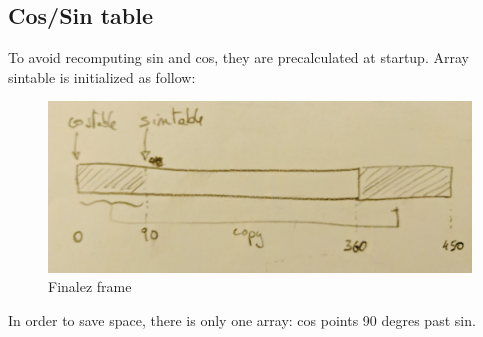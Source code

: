 \begin{minipage}{\linewidth}

\end{minipage}

\subsection{Cos/Sin table}
To avoid recomputing sin and cos, they are precalculated at startup. Array sintable is initialized as follow:

\begin{minipage}{\textwidth}

\end{minipage}


\begin{figure}[H]
 \centering
  \includegraphics[width=\textwidth]{imgs/cos_sin_table.png}
 \caption{Finalez frame} 
\end{figure}

In order to save space, there is only one array: cos points 90 degres past sin.



